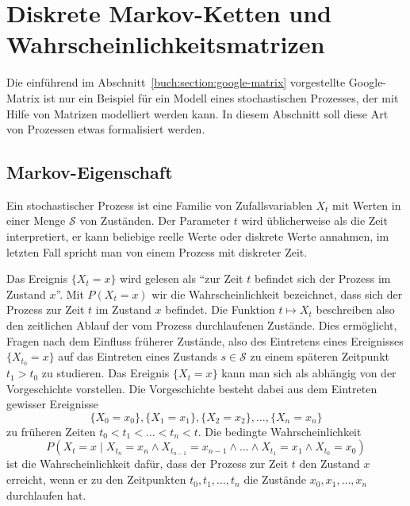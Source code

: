 %
%
%
\section{Diskrete Markov-Ketten und Wahrscheinlichkeitsmatrizen
\label{buch:section:diskrete-markov-ketten}}
Die einführend im Abschnitt~\ref{buch:section:google-matrix}
vorgestellte Google-Matrix ist nur ein Beispiel für ein
Modell eines stochastischen Prozesses, der mit Hilfe von Matrizen
modelliert werden kann.
In diesem Abschnitt soll diese Art von Prozessen etwas formalisiert
werden.

%
% 
\subsection{Markov-Eigenschaft}
Ein stochastischer Prozess ist eine Familie von Zufallsvariablen
%
%
%
$X_t$ mit Werten in einer Menge $\mathcal{S}$ von Zuständen.
Der Parameter $t$ wird üblicherweise als die Zeit interpretiert,
er kann beliebige reelle Werte oder diskrete Werte annahmen, im letzten
Fall spricht man von einem Prozess mit diskreter Zeit.

Das Ereignis $\{X_t=x\}$ wird gelesen als ``zur Zeit $t$ befindet sich
der Prozess im Zustand $x$''.
Mit $P(X_t = x)$ wir die Wahrscheinlichkeit bezeichnet, dass sich
der Prozess zur Zeit $t$ im Zustand $x$ befindet.
Die Funktion $t\mapsto X_t$ beschreiben also den zeitlichen Ablauf
der vom Prozess durchlaufenen Zustände.
Dies ermöglicht, Fragen nach dem Einfluss früherer Zustände,
also des Eintretens eines Ereignisses $\{X_{t_0}=x\}$ auf das Eintreten eines
Zustands $s\in\mathcal{S}$ zu einem späteren Zeitpunkt $t_1>t_0$
zu studieren.
Das Ereignis $\{X_t = x\}$ kann man sich als abhängig von der Vorgeschichte
vorstellen.
%
Die Vorgeschichte besteht dabei aus dem Eintreten gewisser Ereignisse
\[
\{X_0=x_0\},
\{X_1=x_1\},
\{X_2=x_2\},
\dots,
\{X_n=x_n\}
\]
zu früheren Zeiten $t_0<t_1<\dots<t_n<t$.
Die bedingte Wahrscheinlichkeit
\begin{equation}
P(X_t = x \mid
X_{t_n}=x_n\wedge X_{t_{n-1}}=x_{n-1}\wedge\dots\wedge X_{t_1}=x_1\wedge
X_{t_0}=x_0)
\label{buch:wahrscheinlichkeit:eqn:historybedingt}
\end{equation}
ist die Wahrscheinlichkeit dafür, dass der Prozess zur Zeit $t$ den
Zustand $x$ erreicht, wenn er zu den Zeitpunkten $t_0,t_1,\dots,t_n$
die Zustände $x_0,x_1,\dots,x_n$ durchlaufen hat.

